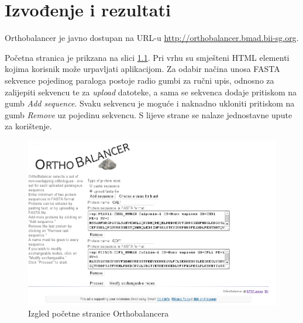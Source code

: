 \chapter{Izvođenje i rezultati}
\label{chap:rezultati}

Orthobalancer je javno dostupan na URL-u
\footnotesize{\url{http://orthobalancer.bmad.bii-sg.org}}.
\normalsize


Početna stranica je prikzana na slici \ref{fig:input-html}. Pri vrhu su
smješteni HTML elementi kojima korisnik može urpavljati aplikacijom. Za odabir
načina unosa FASTA sekvence pojedinog paraloga postoje radio gumbi  za ručni upis, odnosno za zalijepiti sekvencu  te
za \emph{upload} datoteke, a sama se sekvenca dodaje pritiskom na gumb \emph{Add
sequence}. Svaku sekvencu je moguće i naknadno ukloniti pritiskom na gumb
\emph{Remove} uz pojedinu sekvencu. S lijeve strane se nalaze jednostavne upute
za korištenje.

\begin{figure}[h!]
\centering
\includegraphics[width=5.8in]{figures/input-html.png}
\caption{Izgled početne stranice Orthobalancera}
\label{fig:input-html}
\end{figure} 

